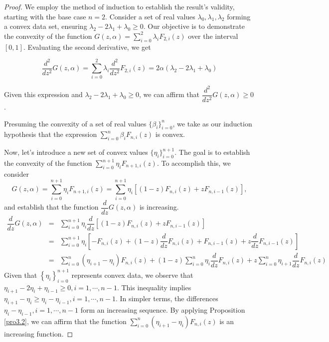 \documentclass[preprint,12pt]{elsarticle}
\theoremstyle{definition}
\theoremstyle{theorem}
\theoremstyle{lemma}
\theoremstyle{example}
\theoremstyle{remark}
\theoremstyle{prop}
\begin{document}
\begin{proof}
We employ the method of induction to establish the result's validity, starting with the base case $n=2$.  Consider a set of real values $ \lambda_{0}, \lambda _{1} , \lambda _{2}$ forming a convex data set, ensuring $\lambda_{2} -2\lambda_{1} +\lambda_{0}\geq 0 $. Our objective is to demonstrate the convexity of the function $ G(z,\alpha)=\sum_{i=0}^{2}\lambda_{i}  F_{2,i}(z)$ over the interval $[0,1]$. Evaluating the second derivative, we get

\begin{equation*}
\dfrac{d^2}{dz^2} G(z,\alpha)=\sum_{i=0}^{2} \lambda_{i}  \dfrac{d^2}{dz^2}  F_{2,i}(z)= 2\alpha \left (\lambda_{2} -2\lambda_{1} +\lambda_{0}   \right )
\end{equation*}

Given this expression and $ \lambda_{2} -2\lambda_{1} +\lambda_{0}\geq 0 $, we can affirm that $ \dfrac{d^2}{dz^2} G(z,\alpha) \geq 0 $.



Presuming the convexity of a set of real values $ \{\beta_{i} \}_{i=0}^{n}$, we take as our induction hypothesis that the expression $ \sum_{i=0}^{n} \beta_{i} F_{n,i}(z) $ is convex.


Now, let's introduce a new set of convex values $ \{\eta_{i}\}_{i=0}^{n+1}$. The goal is to establish the convexity of the function $ \sum_{i=0}^{n+1} \eta_{i} F_{n+1,i}(z) $. To accomplish this, we consider
\begin{equation*} 
G(z,\alpha) =\sum_{i=0}^{n+1} \eta_{i} F_{n+1,i}(z)=\sum_{i=0}^{n+1} \eta_{i}\left [(1-z)F_{n,i}(z)+zF_{n,i-1}(z) \right ],  \end{equation*}
and establish that the function $ \dfrac{d}{dz}G(z,\alpha) $ is  increasing.
\begin{eqnarray*}
\dfrac{d}{dz} G(z,\alpha) &=&\sum_{i=0}^{n+1} \eta_{i} \dfrac{d}{dz} \left [(1-z)F_{n,i}(z)+zF_{n,i-1}(z)  \right ]\\
&=&\sum_{i=0}^{n+1} \eta_{i}\left [-F_{n,i}(z)+(1-z) \dfrac{d}{dz} F_{n,i}(z)+F_{n,i-1}(z)+z \dfrac{d}{dz} F_{n,i-1}(z)  \right ]\\
&=&\sum_{i=0}^{n} ( \eta_{i+1}-\eta_{i})F_{n,i}(z)+(1-z)\sum_{i=0}^{n}\eta_{i} \dfrac{d}{dz} F_{n,i}(z)+z \sum_{i=0}^{n}\eta_{i+1}\dfrac{d}{dz} F_{n,i}(z)
\end{eqnarray*}
Given that $\left \{ \eta_{i}  \right \}_{i=0}^{n+1}$ represents convex data, we observe that $  \eta_{i+1}-2 \eta_{i}+ \eta_{i-1}\geq 0, i=1,\cdots,n-1  $. This inequality implies $  \eta_{i+1}- \eta_{i}\geq \eta_{i}- \eta_{i-1} , i=1,\cdots,n-1  $. In simpler terms, the differences $ \eta_{i}- \eta_{i-1} , i=1,\cdots,n-1 $ form an increasing sequence. By applying Proposition \ref{pro3.2}, we can affirm that the function $ \sum_{i=0}^{n} ( \eta_{i+1}-\eta_{i})F_{n,i}(z) $ is an increasing function.   



\end{proof}
\end{document}

